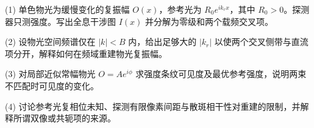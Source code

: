 (1) 单色物光为缓慢变化的复振幅 \(O(x)\)，参考光为 \(R_0e^{ik_rx}\)，其中 \(R_0>0\)。探测器只测强度。写出全息干涉图 \(I(x)\) 并分解为零级和两个载频交叉项。

(2) 设物光空间频谱仅在 \(|k|<B\) 内，给出足够大的 \(|k_r|\) 以使两个交叉侧带与直流项分开，解释如何在频域重建物光复振幅。

(3) 对局部近似常幅物光 \(O=Ae^{i\phi}\) 求强度条纹可见度及最优参考强度，说明两束不匹配时可见度的变化。

(4) 讨论参考光复相位未知、探测有限像素间距与散斑相干性对重建的限制，并解释所谓双像或共轭项的来源。

